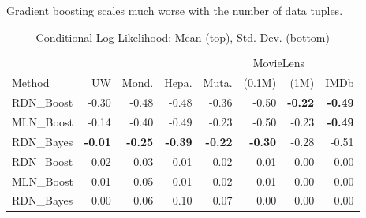 \documentclass[runningheads,a4paper]{llncs}
\newcommand{\iid}{i.i.d.}
\begin{document}
Gradient boosting scales much worse with the number of data tuples.
{\addtolength{\tabcolsep}{2pt}
\begin{table}[tb]
  \centering
  \caption{Conditional Log-Likelihood: Mean (top), Std. Dev. (bottom) }
    \begin{tabular}{l r r r r r r r}
    \hline
                 &          &              &                 &          & \multicolumn{2}{c}{MovieLens} & \\
                                                                                 \cline{6-7}
    Method & UW    & Mond. & Hepa. & Muta. & (0.1M) & (1M) & IMDb \\
    \hline
    RDN\_Boost & -0.30 & -0.48 & -0.48 & -0.36  & -0.50 & \textbf{-0.22} & \textbf{-0.49} \\
    MLN\_Boost & -0.14 & -0.40 & -0.49 & -0.23 & -0.50 & -0.23 & \textbf{-0.49} \\
    RDN\_Bayes & \textbf{-0.01} & \textbf{-0.25} & \textbf{-0.39} & \textbf{-0.22} & \textbf{-0.30} & -0.28 & -0.51 \\
    \hline
    RDN\_Boost & 0.02 & 0.03 & 0.01 & 0.02 & 0.01 & 0.00 & 0.00 \\
    MLN\_Boost & 0.01 & 0.05 & 0.01 & 0.02 & 0.01 & 0.00 & 0.00 \\
    RDN\_Bayes & 0.00 & 0.06 & 0.10 & 0.07 & 0.00 & 0.00 & 0.00 \\
    \hline
    \end{tabular}%
  \label{table:cll}%
\end{table}%
}
\end{document}
